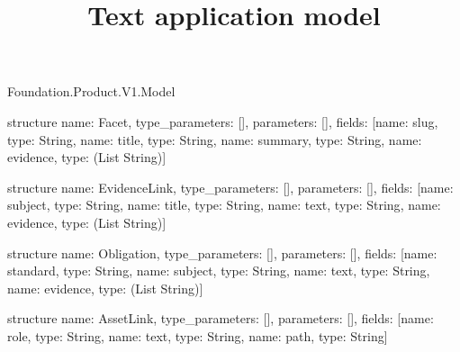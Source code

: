 \begin{lexlean}{Foundation.Product.V1.Model}
\title{Text application model}
\begin{semanticmodule}
structure{
  name: Facet, type_parameters: [], parameters: [],
  fields: [{name: slug, type: String}, {name: title, type: String}, {name: summary, type: String}, {name: evidence, type: (List String)}]
}

structure{
  name: EvidenceLink, type_parameters: [], parameters: [],
  fields: [{name: subject, type: String}, {name: title, type: String}, {name: text, type: String}, {name: evidence, type: (List String)}]
}

structure{
  name: Obligation, type_parameters: [], parameters: [],
  fields: [{name: standard, type: String}, {name: subject, type: String}, {name: text, type: String}, {name: evidence, type: (List String)}]
}

structure{
  name: AssetLink, type_parameters: [], parameters: [],
  fields: [{name: role, type: String}, {name: text, type: String}, {name: path, type: String}]
}
\end{semanticmodule}
\end{lexlean}
